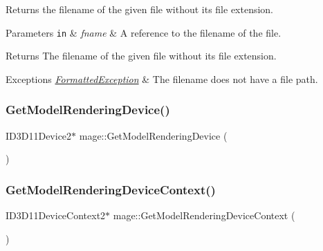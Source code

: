 Returns the filename of the given file without its file extension.


\begin{DoxyParams}[1]{Parameters}
\mbox{\tt in}  & {\em fname} & A reference to the filename of the file. \\
\hline
\end{DoxyParams}
\begin{DoxyReturn}{Returns}
The filename of the given file without its file extension. 
\end{DoxyReturn}

\begin{DoxyExceptions}{Exceptions}
{\em \hyperlink{structmage_1_1_formatted_exception}{Formatted\+Exception}} & The filename does not have a file path. \\
\hline
\end{DoxyExceptions}
\hypertarget{namespacemage_aca16dcb4637f074bb6e33d4ba7929686}{}\label{namespacemage_aca16dcb4637f074bb6e33d4ba7929686} 
\subsubsection{\texorpdfstring{Get\+Model\+Rendering\+Device()}{GetModelRenderingDevice()}}
{\footnotesize\ttfamily I\+D3\+D11\+Device2$\ast$ mage\+::\+Get\+Model\+Rendering\+Device (\begin{DoxyParamCaption}{ }\end{DoxyParamCaption})}

\hypertarget{namespacemage_a1d373a08e09ec19944bf23feb4688b7e}{}\label{namespacemage_a1d373a08e09ec19944bf23feb4688b7e} 
\subsubsection{\texorpdfstring{Get\+Model\+Rendering\+Device\+Context()}{GetModelRenderingDeviceContext()}}
{\footnotesize\ttfamily I\+D3\+D11\+Device\+Context2$\ast$ mage\+::\+Get\+Model\+Rendering\+Device\+Context (\begin{DoxyParamCaption}{ }\end{DoxyParamCaption})}

\hypertarget{namespacemage_a51b4df46661a9038c0d2a14cb3fbe483}{}\label{namespacemage_a51b4df46661a9038c0d2a14cb3fbe483} 
